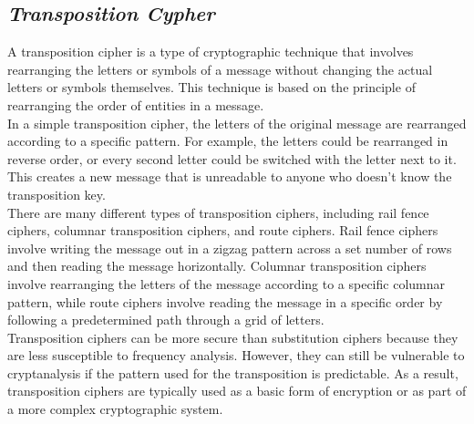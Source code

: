 \documentclass{article}
\begin{document}
\subsection{\textbf{\textit{Transposition Cypher}}}
A transposition cipher is a type of cryptographic technique that involves rearranging the letters or symbols of a message without changing the actual letters or symbols themselves. This technique is based on the principle of rearranging the order of entities in a message.\\

In a simple transposition cipher, the letters of the original message are rearranged according to a specific pattern. For example, the letters could be rearranged in reverse order, or every second letter could be switched with the letter next to it. This creates a new message that is unreadable to anyone who doesn't know the transposition key.\\

There are many different types of transposition ciphers, including rail fence ciphers, columnar transposition ciphers, and route ciphers. Rail fence ciphers involve writing the message out in a zigzag pattern across a set number of rows and then reading the message horizontally. Columnar transposition ciphers involve rearranging the letters of the message according to a specific columnar pattern, while route ciphers involve reading the message in a specific order by following a predetermined path through a grid of letters.\\

Transposition ciphers can be more secure than substitution ciphers because they are less susceptible to frequency analysis. However, they can still be vulnerable to cryptanalysis if the pattern used for the transposition is predictable. As a result, transposition ciphers are typically used as a basic form of encryption or as part of a more complex cryptographic system.
\end{document}
